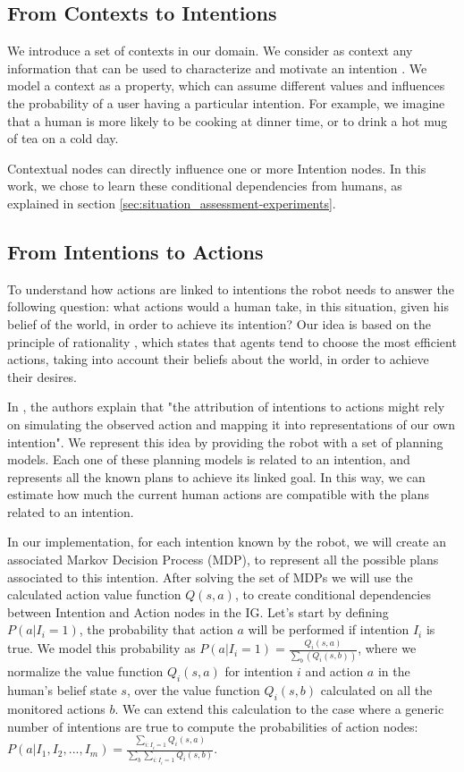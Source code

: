 \subsection{From Contexts to Intentions}
We introduce a set of contexts in our domain. We consider as context any information that can be used to characterize and motivate an intention \cite{abowd1999towards}. We model a context  as a property, which can assume different values and influences the probability of a user having a particular intention. For example, we imagine that a human is more likely to be cooking at dinner time, or to drink a hot mug of tea on a cold day.

Contextual nodes can directly influence one or more Intention nodes. In this work, we chose to learn these conditional dependencies from humans, as explained in section \ref{sec:situation_assessment-experiments}.

\subsection{From Intentions to Actions}
\label{sec:situation_assessment-action_evaluation}
To understand how actions are linked to intentions the robot needs to answer the following question: what actions would a human take, in this situation, given his belief of the world, in order to achieve its intention?
Our idea is based on the principle of rationality \cite{Dennet1989}, which states that agents tend to choose the most efficient actions, taking into account their beliefs about the world, in order to achieve their desires.

In \cite{Blakemore2001}, the authors explain that "the attribution of intentions to actions might rely on simulating the observed action and mapping it into representations of our own intention". We represent this idea by providing the robot with a set of planning models. Each one of these planning models is related to an intention, and represents all the known plans to achieve its linked goal. In this way, we can estimate how much the current human actions are compatible with the plans related to an intention.

In our implementation, for each intention known by the robot, we will create an associated Markov Decision Process (MDP), to represent all the possible plans associated to this intention. After solving the set of MDPs we will use the calculated action value function \(Q(s,a)\), to create conditional dependencies between Intention and Action nodes in the IG. Let's start by defining \(P(a|I_i=1)\), the probability that action $a$ will be performed if intention $I_i$ is true. We model this probability as \(P(a|I_i=1)=\frac{Q_i(s,a)}{\sum_b(Q_i(s,b))}\), where we normalize the value function $Q_i(s,a)$ for intention $i$ and action $a$ in the human's belief state $s$, over the value function $Q_i(s,b)$ calculated on all the monitored actions $b$. We can extend this calculation to the case where a generic number of intentions are true to compute the probabilities of action nodes: \(P(a|I_1,I_2,...,I_m)=\frac{\sum_{i:I_i=1}Q_i(s,a)}{\sum_b\sum_{i:I_i=1}Q_i(s,b)}\).

